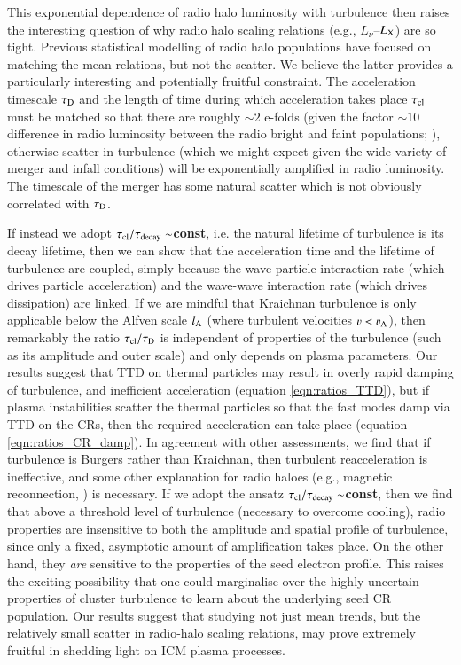 \documentclass[fleqn,usenatbib,useAMS]{mnras}
\newcommand\C[1]{{\bf #1}}
\begin{document}
This exponential dependence of radio halo luminosity with turbulence then raises
the interesting question of why radio halo scaling relations (e.g.,
$L_{\nu}$--$L_{\rm X}$) are so tight. Previous statistical modelling of radio
halo populations \citep{2006MNRAS.369.1577C,2007MNRAS.378.1565C} have focused on
matching the mean relations, but not the scatter. We believe the latter provides
a particularly interesting and potentially fruitful constraint. The acceleration
timescale $\tau_{\rm D}$ and the length of time during which acceleration takes
place $\tau_{\rm cl}$ must be matched so that there are roughly $\sim 2$ e-folds
(given the factor $\sim 10$ difference in radio luminosity between the radio
bright and faint populations; \citealt{2011ApJ...740L..28B}), otherwise scatter
in turbulence (which we might expect given the wide variety of merger and infall
conditions) will be exponentially amplified in radio luminosity. The timescale
of the merger has some natural scatter which is not obviously correlated with
$\tau_{\rm D}$.

If instead we adopt \C{$\tau_{\rm cl}/\tau_{\rm decay} \sim$const}, i.e. the natural
lifetime of turbulence is its decay lifetime, then we can show that the
acceleration time and the lifetime of turbulence are coupled, simply because the
wave-particle interaction rate (which drives particle acceleration) and the
wave-wave interaction rate (which drives dissipation) are linked. If we are
mindful that Kraichnan turbulence is only applicable below the Alfven scale
$l_{\rm A}$ (where turbulent velocities $\varv < \varv_{\rm A}$), then remarkably the
ratio $\tau_{\rm cl}/\tau_{\rm D}$ is independent of properties of the
turbulence (such as its amplitude and outer scale) and only depends on plasma
parameters. Our results suggest that TTD on thermal particles may result in
overly rapid damping of turbulence, and inefficient acceleration (equation
\ref{eqn:ratios_TTD}), but if plasma instabilities scatter the thermal particles
so that the fast modes damp via TTD on the CRs, then the required
acceleration can take place (equation \ref{eqn:ratios_CR_damp}). In agreement
with other assessments, we find that if turbulence is Burgers rather than
Kraichnan, then turbulent reacceleration is ineffective, and some other
explanation for radio haloes (e.g., magnetic reconnection, \citealt{brunetti16}) is
necessary. If we adopt the ansatz \C{$\tau_{\rm cl}/\tau_{\rm decay} \sim$const}, then we
find that above a threshold level of turbulence (necessary to overcome cooling),
radio properties are insensitive to both the amplitude and spatial profile of
turbulence, since only a fixed, asymptotic amount of amplification takes
place. On the other hand, they {\it are} sensitive to the properties of the seed
electron profile. This raises the exciting possibility that one could
marginalise over the highly uncertain properties of cluster turbulence to learn
about the underlying seed CR population. Our results suggest that studying not
just mean trends, but the relatively small scatter in radio-halo scaling
relations, may prove extremely fruitful in shedding light on ICM plasma
processes.
\end{document}
